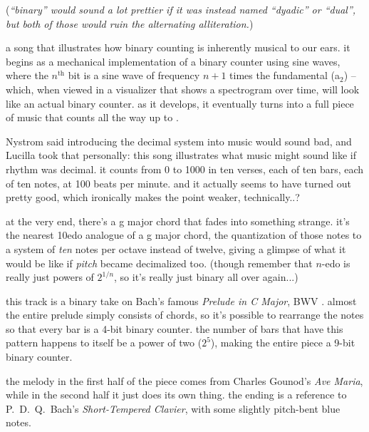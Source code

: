 \documentclass[a4paper, 12pt]{report}
\begin{document}
({\it ``binary'' would sound a lot prettier if it was instead named ``dyadic'' or ``dual'', but both of those would ruin the alternating alliteration.})

\restoregeometry

\newpage


a song that illustrates how binary counting is inherently musical to our ears. it begins as a mechanical implementation of a binary counter using sine waves, where the $n^{\text{th}}$ bit is a sine wave of frequency $n + 1$ times the fundamental ({\sc a$_2$}) -- which, when viewed in a visualizer that shows a spectrogram over time, will look like an actual binary counter. as it develops, it eventually turns into a full piece of music that counts all the way up to \io\jz\jo\jo\io\jo\jo\jo\io.


Nystrom said introducing the decimal system into music would sound bad, and Lucilla took that personally: this song illustrates what music might sound like if rhythm was decimal. it counts from 0 to 1000 in ten verses, each of ten bars, each of ten notes, at 100 beats per minute. and it actually seems to have turned out pretty good, which ironically makes the point weaker, technically..?

at the very end, there's a {\sc g} major chord that fades into something strange. it's the nearest 10edo analogue of a {\sc g} major chord, the quantization of those notes to a system of \emph{ten} notes per octave instead of twelve, giving a glimpse of what it would be like if \emph{pitch} became decimalized too. (though remember that $n$-edo is really just powers of $2^{1/n}$, so it's really just binary all over again...)


this track is a binary take on Bach's famous {\it Prelude in C Major}, BWV \jo\io\jz\jo\jz\iz\jo\jo\jo\iz. almost the entire prelude simply consists of chords, so it's possible to rearrange the notes so that every bar is a 4-bit binary counter. the number of bars that have this pattern happens to itself be a power of two ($2^5$), making the entire piece a 9-bit binary counter.

the melody in the first half of the piece comes from Charles Gounod's {\it Ave Maria}, while in the second half it just does its own thing. the ending is a reference to P.~D.~Q.~Bach's {\it Short-Tempered Clavier}, with some slightly pitch-bent blue notes.
\end{document}
